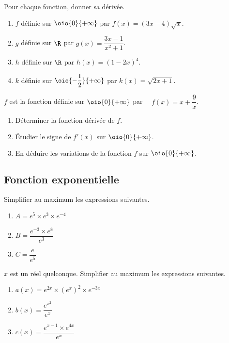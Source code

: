\documentclass[a4paper,11pt,exos]{nsi} %
\begin{document}
\exo{}
Pour chaque fonction, donner sa dérivée.
\begin{multicols}{2}
    \begin{enumerate}
        \item $f$ définie sur $\oio{0}{+\infty}$ par $f(x)=(3x-4)\sqrt{x}$.
        \item $g$ définie sur $\R$ par $g(x)=\dfrac{3x-1}{x^2+1}$.
        \item $h$ définie sur $\R$ par $h(x)=(1-2x)^4$.
        \item $k$ définie sur $\oio{-\dfrac{1}{2}}{+\infty}$ par $k(x)=\sqrt{2x+1}$.
    \end{enumerate}
\end{multicols}

\exo{}
$f$ est la fonction définie sur $\oio{0}{+\infty}$ par $\quad f(x)=x+\dfrac{9}{x}$.
\begin{enumerate}
    \item Déterminer la fonction dérivée de $f$.
    \item Étudier le signe de $f'(x)$ sur $\oio{0}{+\infty}$.
    \item En déduire les variations de la fonction $f$ sur $\oio{0}{+\infty}$.
\end{enumerate}

\subsection*{Fonction exponentielle}
\exo{}
Simplifier au maximum les expressions suivantes.
\begin{multicols}{3}
	\begin{enumerate}[label=\textbullet]
		\item 	$A=e^5\times e^3 \times e^{-4}$
		\item	$B=\dfrac{e^{-3}\times e^8}{e^3}$	
		\item	$C=\dfrac{e}{e^5}$
	\end{enumerate}
\end{multicols}

\exo{}
$x$ est un réel quelconque. Simplifier au maximum les expressions suivantes.
\begin{multicols}{3}
	\begin{enumerate}[label=\textbullet]
		\item 	$a(x)=e^{2x}\times \left(e^x\right)^2\times e^{-3x}$
		\item 	$b(x)=\dfrac{e^{x^2}}{e^x}$	
		\item	$c(x)=\dfrac{e^{x-1}\times e^{4x}}{e^x}$
	\end{enumerate}
\end{multicols}
\end{document}

